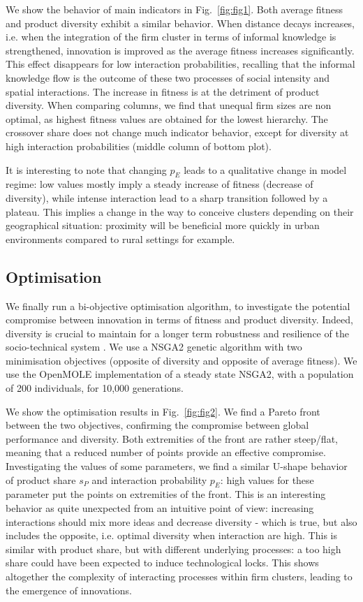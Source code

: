 \documentclass[letterpaper]{article}
\begin{document}
We show the behavior of main indicators in Fig.~\ref{fig:fig1}. Both average fitness and product diversity exhibit a similar behavior. When distance decays increases, i.e. when the integration of the firm cluster in terms of informal knowledge is strengthened, innovation is improved as the average fitness increases significantly. This effect disappears for low interaction probabilities, recalling that the informal knowledge flow is the outcome of these two processes of social intensity and spatial interactions. The increase in fitness is at the detriment of product diversity. When comparing columns, we find that unequal firm sizes are non optimal, as highest fitness values are obtained for the lowest hierarchy. The crossover share does not change much indicator behavior, except for diversity at high interaction probabilities (middle column of bottom plot).

It is interesting to note that changing $p_E$ leads to a qualitative change in model regime: low values mostly imply a steady increase of fitness (decrease of diversity), while intense interaction lead to a sharp transition followed by a plateau. This implies a change in the way to conceive clusters depending on their geographical situation: proximity will be beneficial more quickly in urban environments compared to rural settings for example.




\subsection{Optimisation}

We finally run a bi-objective optimisation algorithm, to investigate the potential compromise between innovation in terms of fitness and product diversity. Indeed, diversity is crucial to maintain for a longer term robustness and resilience of the socio-technical system \citep{reinmoeller2005link}. We use a NSGA2 genetic algorithm with two minimisation objectives (opposite of diversity and opposite of average fitness). We use the OpenMOLE implementation of a steady state NSGA2, with a population of 200 individuals, for 10,000 generations.

We show the optimisation results in Fig.~\ref{fig:fig2}. We find a Pareto front between the two objectives, confirming the compromise between global performance and diversity. Both extremities of the front are rather steep/flat, meaning that a reduced number of points provide an effective compromise. Investigating the values of some parameters, we find a similar U-shape behavior of product share $s_P$ and interaction probability $p_E$: high values for these parameter put the points on extremities of the front. This is an interesting behavior as quite unexpected from an intuitive point of view: increasing interactions should mix more ideas and decrease diversity - which is true, but also includes the opposite, i.e. optimal diversity when interaction are high. This is similar with product share, but with different underlying processes: a too high share could have been expected to induce technological locks. This shows altogether the complexity of interacting processes within firm clusters, leading to the emergence of innovations.
\end{document}
